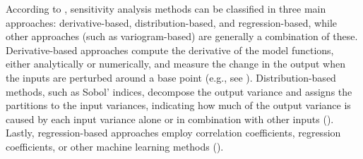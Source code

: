 \documentclass[twocolumn]{rps-esrel2022}
\begin{document}
According to \cite{razavi2021future}, sensitivity analysis methods can be classified in three main approaches: derivative-based, distribution-based, and regression-based, while other approaches (such as variogram-based) are generally a combination of these.
Derivative-based approaches compute the derivative of the model functions, either analytically or numerically, and measure the change in
the output when the inputs are perturbed around a base point (e.g., see \cite{errico1997adjoint}).
Distribution-based methods, such as Sobol' indices, decompose the output variance and assigns the partitions to the input variances, indicating how much
of the output variance is caused by each input variance alone or in combination with other inputs (\cite{saltelli2010variance}).
Lastly, regression-based approaches employ correlation coefficients, regression coefficients, or other machine learning methods (\cite{sudret2008global}).
\end{document}
